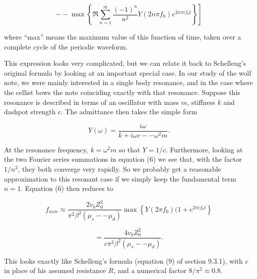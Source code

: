   $$\left. -- \max \left\lbrace \Re\sum_{n=1}^\infty{\dfrac{(-1)^n }{n^2} Y(2 n 
  \pi f_0) e^{2n \pi i f_0 t}} \right\rbrace \right] \tag{6}$$ 

  where ``max'' means the maximum value of this function of time, taken over a 
  complete cycle of the periodic waveform. 

  This expression looks very complicated, but we can relate it back to 
  Schelleng's original formula by looking at an important special case. In our 
  study of the wolf note, we were mainly interested in a single body resonance, 
  and in the case where the cellist bows the note coinciding exactly with that 
  resonance. Suppose this resonance is described in terms of an oscillator with 
  mass $m$, stiffness $k$ and dashpot strength $c$. The admittance then takes 
  the simple form 

  $$Y(\omega)=\frac{i \omega}{k + i \omega c -- \omega^2 m} . \tag{7}$$ 

  At the resonance frequency, $k=\omega^2 m$ so that $Y=1/c$. Furthermore, 
  looking at the two Fourier series summations in equation (6) we see that, 
  with the factor $1/n^2$, they both converge very rapidly. So we probably get 
  a reasonable approximation to this resonant case if we simply keep the 
  fundamental term $n=1$. Equation (6) then reduces to 

  $$f_{min} \approx \dfrac{2 v_b Z^2_0}{\pi^2 \beta^2 (\mu_s -- \mu_d)} \max 
  \left\lbrace Y(2 \pi f_0) (1+e^{2 \pi i f_0 t} \right\rbrace$$ 

  $$ = \dfrac{4 v_b Z^2_0}{c \pi^2 \beta^2 (\mu_s -- \mu_d)} . \tag{8}$$ 

  This looks exactly like Schelleng's formula (equation (9) of section 9.3.1), 
  with $c$ in place of his assumed resistance $R$, and a numerical factor 
  $8/\pi^2 \approx 0.8$. 